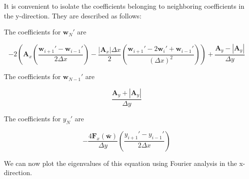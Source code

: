 \documentclass[10pt]{article}
\begin{document}
	 It is convenient to isolate the coefficients belonging to neighboring coefficients in the y-direction. They are described as follows:
	
	The coefficients for $\mathbf{w}_N'$ are
	
	$$ - 2 \left( \mathbf{A}_x \left( \frac{\mathbf{w}_{i+1}' - \mathbf{w}_{i-1}'}{2 \Delta x}\right) - \frac{|\mathbf{A}_x| \Delta x}{2} \left( \frac{\mathbf{w}_{i+1}' - 2 \mathbf{w}_i' + \mathbf{w}_{i-1}'}{(\Delta x)^2} \right) \right) + \frac{\mathbf{A}_y - |\mathbf{A}_y|}{\Delta y} $$
	
	The coefficients for $\mathbf{w}_{N-1}'$ are
	
	$$ \frac{\mathbf{A}_y + |\mathbf{A}_y|}{\Delta y} $$
	
	The coefficients for $y_N'$ are
	
	$$ -\frac{4 \mathbf{F}_{x}(\bar{\mathbf{w}})}{\Delta y}    \left( \frac{y_{i+1}' - y_{i-1}'}{2 \Delta x} \right) $$
	
	We can now plot the eigenvalues of this equation using Fourier analysis in the x-direction. 
	
\end{document}
